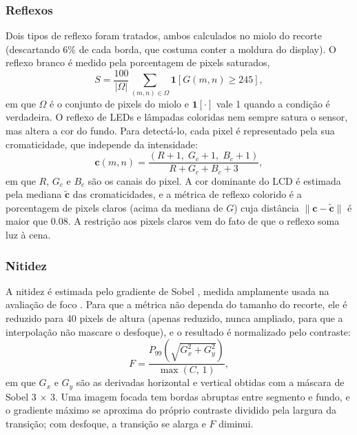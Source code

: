 \documentclass[10pt,twocolumn,letterpaper]{article}
\begin{document}
\subsubsection{Reflexos}
Dois tipos de reflexo foram tratados, ambos calculados no miolo do recorte
(descartando 6\% de cada borda, que costuma conter a moldura do display). O
reflexo branco é medido pela porcentagem de pixels saturados,
\begin{equation}
  S = \frac{100}{|\Omega|} \sum_{(m,n) \in \Omega} \mathbf{1}\!\left[G(m,n) \ge 245\right],
  \label{eq:saturados}
\end{equation}
em que $\Omega$ é o conjunto de pixels do miolo e $\mathbf{1}[\cdot]$ vale 1
quando a condição é verdadeira. O reflexo de LEDs e lâmpadas coloridas nem
sempre satura o sensor, mas altera a cor do fundo. Para detectá-lo, cada pixel
é representado pela sua cromaticidade, que independe da intensidade:
\begin{equation}
  \mathbf{c}(m,n) = \frac{(R+1,\; G_c+1,\; B_c+1)}{R + G_c + B_c + 3},
  \label{eq:cromaticidade}
\end{equation}
em que $R$, $G_c$ e $B_c$ são os canais do pixel. A cor dominante do LCD é
estimada pela mediana $\tilde{\mathbf{c}}$ das cromaticidades, e a métrica de
reflexo colorido é a porcentagem de pixels claros (acima da mediana de $G$)
cuja distância $\lVert \mathbf{c} - \tilde{\mathbf{c}} \rVert$ é maior que 0.08.
A restrição aos pixels claros vem do fato de que o reflexo soma luz à cena.

\subsubsection{Nitidez}
A nitidez é estimada pelo gradiente de Sobel \cite{gonzalez}, medida
amplamente usada na avaliação de foco \cite{pech}. Para que a métrica não
dependa do tamanho do recorte, ele é reduzido para 40 pixels de altura (apenas
reduzido, nunca ampliado, para que a interpolação não mascare o desfoque), e o
resultado é normalizado pelo contraste:
\begin{equation}
  F = \frac{P_{99}\!\left(\sqrt{G_x^2 + G_y^2}\right)}{\max(C,\, 1)},
  \label{eq:nitidez}
\end{equation}
em que $G_x$ e $G_y$ são as derivadas horizontal e vertical obtidas com a
máscara de Sobel 3 × 3. Uma imagem focada tem bordas abruptas entre segmento e
fundo, e o gradiente máximo se aproxima do próprio contraste dividido pela
largura da transição; com desfoque, a transição se alarga e $F$ diminui.
\end{document}
